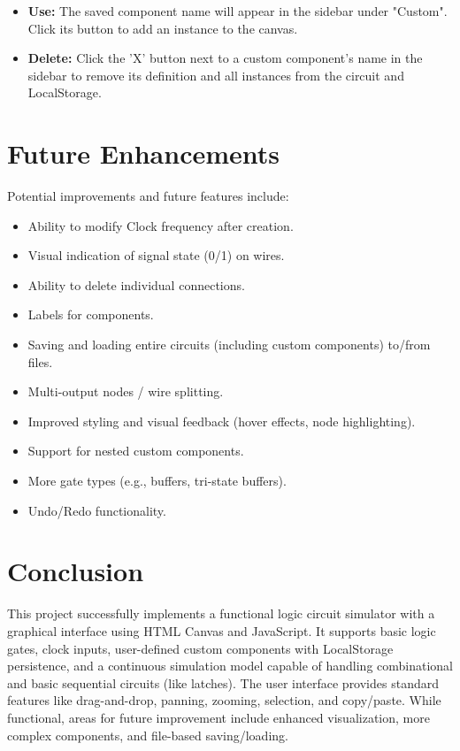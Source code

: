 \documentclass[11pt, a4paper]{article}
\begin{document}
\begin{enumerate}[leftmargin=*]
\begin{itemize}
        \item \textbf{Use:} The saved component name will appear in the sidebar under "Custom". Click its button to add an instance to the canvas.
        \item \textbf{Delete:} Click the 'X' button next to a custom component's name in the sidebar to remove its definition and all instances from the circuit and LocalStorage.
    \end{itemize}
\end{enumerate}

\section{Future Enhancements}
Potential improvements and future features include:
\begin{itemize}[leftmargin=*]
    \item Ability to modify Clock frequency after creation.
    \item Visual indication of signal state (0/1) on wires.
    \item Ability to delete individual connections.
    \item Labels for components.
    \item Saving and loading entire circuits (including custom components) to/from files.
    \item Multi-output nodes / wire splitting.
    \item Improved styling and visual feedback (hover effects, node highlighting).
    \item Support for nested custom components.
    \item More gate types (e.g., buffers, tri-state buffers).
    \item Undo/Redo functionality.
\end{itemize}

\section{Conclusion}
This project successfully implements a functional logic circuit simulator with a graphical interface using HTML Canvas and JavaScript. It supports basic logic gates, clock inputs, user-defined custom components with LocalStorage persistence, and a continuous simulation model capable of handling combinational and basic sequential circuits (like latches). The user interface provides standard features like drag-and-drop, panning, zooming, selection, and copy/paste. While functional, areas for future improvement include enhanced visualization, more complex components, and file-based saving/loading.
\end{document}
